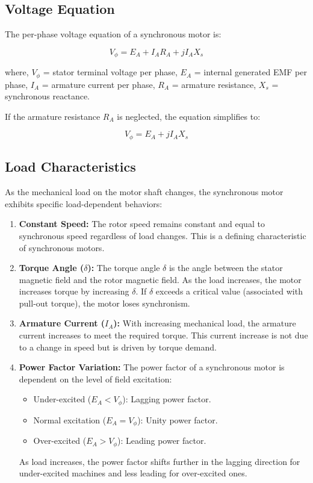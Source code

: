 \documentclass[a4paper,12pt]{article}
\begin{document}
\subsection*{Voltage Equation}

The per-phase voltage equation of a synchronous motor is:

\begin{equation}
	V_\phi = E_A + I_A R_A + jI_A X_s
\end{equation}

where,  
$V_\phi$ = stator terminal voltage per phase,  
$E_A$ = internal generated EMF per phase,  
$I_A$ = armature current per phase,  
$R_A$ = armature resistance,  
$X_s$ = synchronous reactance.

If the armature resistance $R_A$ is neglected, the equation simplifies to:

\begin{equation}
	V_\phi = E_A + jI_A X_s
\end{equation}

\subsection*{Load Characteristics}

As the mechanical load on the motor shaft changes, the synchronous motor exhibits specific load-dependent behaviors:

\begin{enumerate}
	\item \textbf{Constant Speed:} The rotor speed remains constant and equal to synchronous speed regardless of load changes. This is a defining characteristic of synchronous motors.
	
	\item \textbf{Torque Angle ($\delta$):} The torque angle $\delta$ is the angle between the stator magnetic field and the rotor magnetic field. As the load increases, the motor increases torque by increasing $\delta$. If $\delta$ exceeds a critical value (associated with pull-out torque), the motor loses synchronism.
	
	\item \textbf{Armature Current ($I_A$):} With increasing mechanical load, the armature current increases to meet the required torque. This current increase is not due to a change in speed but is driven by torque demand.
	
	\item \textbf{Power Factor Variation:} The power factor of a synchronous motor is dependent on the level of field excitation:
	\begin{itemize}
		\item Under-excited ($E_A < V_\phi$): Lagging power factor.
		\item Normal excitation ($E_A = V_\phi$): Unity power factor.
		\item Over-excited ($E_A > V_\phi$): Leading power factor.
	\end{itemize}
	As load increases, the power factor shifts further in the lagging direction for under-excited machines and less leading for over-excited ones.
\end{enumerate}
\end{document}
